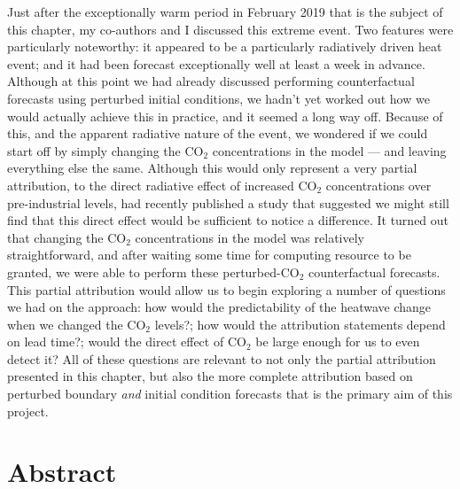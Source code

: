   Just after the exceptionally warm period in February 2019 that is the subject of this chapter, my co-authors and I discussed this extreme event. Two features were particularly noteworthy: it appeared to be a particularly radiatively driven heat event; and it had been forecast exceptionally well at least a week in advance. Although at this point we had already discussed performing counterfactual forecasts using perturbed initial conditions, we hadn't yet worked out how we would actually achieve this in practice, and it seemed a long way off. Because of this, and the apparent radiative nature of the event, we wondered if we could start off by simply changing the CO$_2$ concentrations in the model --- and leaving everything else the same. Although this would only represent a very partial attribution, to the direct radiative effect of increased CO$_2$ concentrations over pre-industrial levels, \citet{baker_higher_2018} had recently published a study that suggested we might still find that this direct effect would be sufficient to notice a difference. It turned out that changing the CO$_2$ concentrations in the model was relatively straightforward, and after waiting some time for computing resource to be granted, we were able to perform these perturbed-CO$_2$ counterfactual forecasts. This partial attribution would allow us to begin exploring a number of questions we had on the approach: how would the predictability of the heatwave change when we changed the CO$_2$ levels?; how would the attribution statements depend on lead time?; would the direct effect of CO$_2$ be large enough for us to even detect it? All of these questions are relevant to not only the partial attribution presented in this chapter, but also the more complete attribution based on perturbed boundary \emph{and} initial condition forecasts that is the primary aim of this project.

\section{Abstract}\label{ch3:abstract}

